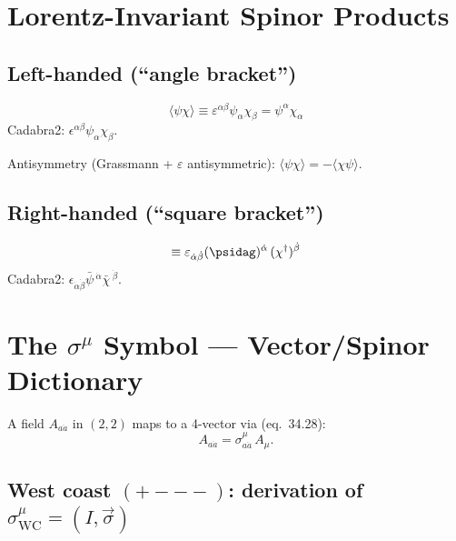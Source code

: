 \section{Lorentz-Invariant Spinor Products}

\subsection{Left-handed (``angle bracket'')}
\begin{equation}
  \langle\psi\chi\rangle
  \equiv \varepsilon^{\alpha\beta}\psi_\alpha\chi_\beta
  = \psi^\alpha\chi_\alpha
  \tag{35.21 preview}
\end{equation}
Cadabra2: $\epsilon^{\alpha \beta} \psi_{\alpha} \chi_{\beta}$.

Antisymmetry (Grassmann + $\varepsilon$ antisymmetric):
$\langle\psi\chi\rangle = -\langle\chi\psi\rangle$.

\subsection{Right-handed (``square bracket'')}
\begin{equation}
  [\psidag\,\chi^{\dagger}]
  \equiv \varepsilon_{\dot{\alpha}\dot{\beta}}
         (\psidag)^{\dot{\alpha}}\,(\chi^{\dagger})^{\dot{\beta}}
\end{equation}
Cadabra2: $\epsilon_{\dot{\alpha} \dot{\beta}} \bar{\psi}\,^{\dot{\alpha}} \bar{\chi}\,^{\dot{\beta}}$.

\section{The \texorpdfstring{$\sigma^\mu$}{sigma\^mu} Symbol ---
         Vector/Spinor Dictionary}

A field $A_{a\dot{a}}$ in $(2,2)$ maps to a 4-vector via (eq.~34.28):
\begin{equation}
  A_{a\dot{a}} = \sigma^\mu_{a\dot{a}}\,A_\mu.
  \tag{34.28}
\end{equation}

\subsection{West coast \texorpdfstring{$(+{-}{-}{-})$}{(+---)}: derivation of
  \texorpdfstring{$\sigma^\mu_{\mathrm{WC}} = (I,\vec{\sigma})$}{sigma\^mu WC}}

